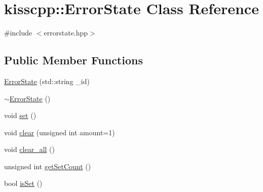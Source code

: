 \hypertarget{a00024}{\section{kisscpp\-:\-:Error\-State Class Reference}
\label{a00024}
}


{\ttfamily \#include $<$errorstate.\-hpp$>$}

\subsection*{Public Member Functions}
\begin{DoxyCompactItemize}
\item 
\hyperlink{a00024_ad51f90a7606a12bc2d9053151441d343}{Error\-State} (std\-::string \-\_\-id)
\item 
\hyperlink{a00024_a75f55fa61878bb008abd861012b88662}{$\sim$\-Error\-State} ()
\item 
void \hyperlink{a00024_adba9283ecd7976c57ef48d438da86778}{set} ()
\item 
void \hyperlink{a00024_af46a0feee156aca2e7aae7695b0febcf}{clear} (unsigned int amount=1)
\item 
void \hyperlink{a00024_aa9da790733f2f6963a5b6ca1167d137b}{clear\-\_\-all} ()
\item 
unsigned int \hyperlink{a00024_a211a4d0740010a7aa7c78b8514bc6969}{get\-Set\-Count} ()
\item 
bool \hyperlink{a00024_a79c9043eb6c04a10e7c4b86888697ce8}{is\-Set} ()
\end{DoxyCompactItemize}


